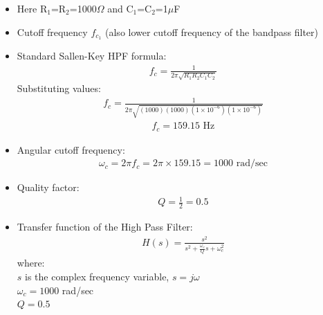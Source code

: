 \documentclass{article}
\begin{document}
\begin{itemize}
    \item Here R$_1$=R$_2$=1000$\Omega$ and C$_1$=C$_2$=1$\mu$F
    \item Cutoff frequency $f_{c_1}$ (also lower cutoff frequency of the bandpass filter)
    \item Standard Sallen-Key HPF formula:
    \begin{align}
        f_c = \frac{1}{2\pi\sqrt{R_1R_2C_1C_2}}
    \end{align}
    Substituting values:
    \begin{align}
        f_c = \frac{1}{2\pi\sqrt{(1000)(1000)(1 \times 10^{-6})(1 \times 10^{-6})}}
    \end{align}
    \begin{align}
        f_c = 159.15 \text{ Hz}
    \end{align}
    \item Angular cutoff frequency:
    \begin{align}
        \omega_c = 2\pi f_c = 2\pi \times 159.15 = 1000 \text{ rad/sec}
    \end{align}
    \item Quality factor:
    \begin{align}
        Q = \frac{1}{2} = 0.5
    \end{align}
    \item Transfer function of the High Pass Filter:
    \begin{align}
        H(s) = \frac{s^2}{s^2 + \frac{\omega_c}{Q}s + \omega_c^2}
    \end{align}
    where:\\
    $s$ is the complex frequency variable, $s = j\omega$ \\
    $\omega_c = 1000$ rad/sec \\
    $Q = 0.5$
\end{itemize}
\end{document}
